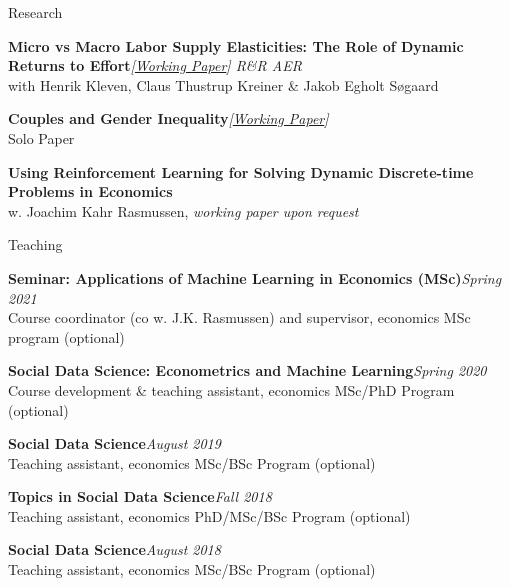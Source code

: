 \documentclass[
	11pt, %
]{resume} %
\begin{document}

\begin{rSection}{Research}

    \textbf{Micro vs Macro Labor Supply Elasticities: The Role of Dynamic Returns to Effort}\hfill \textit{[\href{https://www.nber.org/papers/w31549}{Working Paper}] R\&R AER} \\
    with Henrik Kleven, Claus Thustrup Kreiner \& Jakob Egholt Søgaard

    \textbf{Couples and Gender Inequality}\hfill \textit{[\href{https://ssrn.com/abstract=4697847}{Working Paper}]} \\
    Solo Paper

    \textbf{Using Reinforcement Learning for Solving Dynamic Discrete-time Problems in Economics} \\
    w. Joachim Kahr Rasmussen, \textit{working paper upon request}
\end{rSection}

\begin{rSection}{Teaching}

    \textbf{Seminar: Applications of Machine Learning in Economics (MSc)}\hfill \textit{Spring 2021} \\
    Course coordinator (co w. J.K. Rasmussen) and supervisor, economics MSc program (optional)

    \textbf{Social Data Science: Econometrics and Machine Learning}\hfill \textit{Spring 2020} \\
    Course development \& teaching assistant, economics MSc/PhD Program (optional)

    \textbf{Social Data Science}\hfill \textit{August 2019} \\
    Teaching assistant, economics MSc/BSc Program (optional)

    \textbf{Topics in Social Data Science}\hfill \textit{Fall 2018} \\
    Teaching assistant, economics PhD/MSc/BSc Program (optional)

    \textbf{Social Data Science}\hfill \textit{August 2018} \\
    Teaching assistant, economics MSc/BSc Program (optional)

\end{rSection}


\newpage
\end{document}
